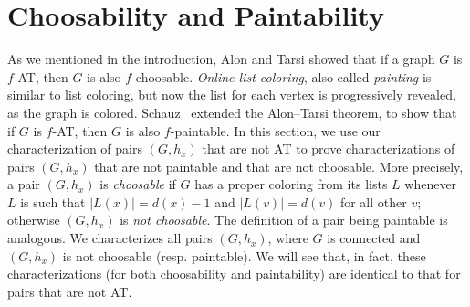 \documentclass[12pt]{article}
\theoremstyle{plain}
\newtheorem{lem}[thm]{Lemma}
\theoremstyle{definition}
\newtheorem{defn}{Definition}
\theoremstyle{remark}
\newcommand{\fancy}[1]{\mathcal{#1}}
\newcommand{\parens}[1]{\left( #1 \right)}
\def\B{\fancy{B}}
\begin{document}
%

\section{Choosability and Paintability}
As we mentioned in the introduction, Alon and Tarsi showed that if a graph $G$
is $f$-AT, then $G$ is also $f$-choosable.  \emph{Online list coloring}, also
called \emph{painting} is similar to list coloring, but now the list for each
vertex is progressively revealed, as the graph is colored. 
Schauz~\cite{schauz2010flexible} extended the Alon--Tarsi theorem, to show that
if $G$ is $f$-AT, then $G$ is also $f$-paintable.  In this section, we use our
characterization of pairs $(G,h_x)$ that are not AT to prove characterizations
of pairs $(G,h_x)$ that are not paintable and that are not choosable.  More
precisely, a pair $(G,h_x)$ is \emph{choosable} if $G$ has a proper coloring
from its lists $L$ whenever $L$ is such that $|L(x)|=d(x)-1$ and $|L(v)|=d(v)$
for all other $v$; otherwise $(G,h_x)$ is \emph{not choosable}.  The definition
of a pair being paintable is analogous.  We characterizes all pairs $(G,h_x)$,
where $G$ is connected and $(G,h_x)$ is not choosable (resp. paintable).  We
will see that, in fact, these characterizations (for both choosability and
paintability) are identical to that for pairs that are not AT.  
\end{document}
